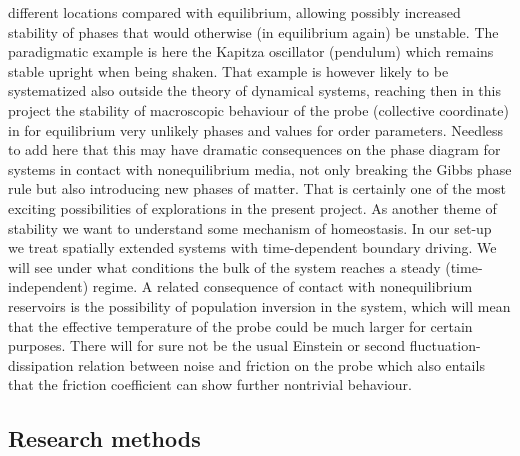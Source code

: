 different locations compared with equilibrium, allowing possibly increased stability of
phases that would otherwise (in equilibrium again) be unstable.  The paradigmatic example is
here the Kapitza oscillator (pendulum) which remains stable upright when being shaken.  That
example is however likely to be systematized also outside the theory of dynamical systems,
reaching then in this project the stability of macroscopic behaviour of the probe
(collective coordinate) in for equilibrium very unlikely phases and values for order
parameters.  Needless to add here that this may have dramatic consequences on the phase
diagram for systems in contact with nonequilibrium media, not only breaking the Gibbs phase
rule but also introducing new phases of matter.  That is certainly one of the most exciting
possibilities of explorations in the present project. As another theme of stability we want
to understand some mechanism of homeostasis. In our set-up we treat spatially extended
systems with time-dependent boundary driving. We will see under what conditions the bulk of
the system reaches a steady (time-independent) regime. A related consequence of contact with
nonequilibrium reservoirs is the possibility of population inversion in the system, which
will mean that the effective temperature of the probe could be much larger for certain
purposes.  There will for sure not be the usual Einstein or second fluctuation-dissipation
relation between noise and friction on the probe which also entails that the friction
coefficient can show further nontrivial behaviour.  


\subsection{Research methods}\label{sec:methods}

